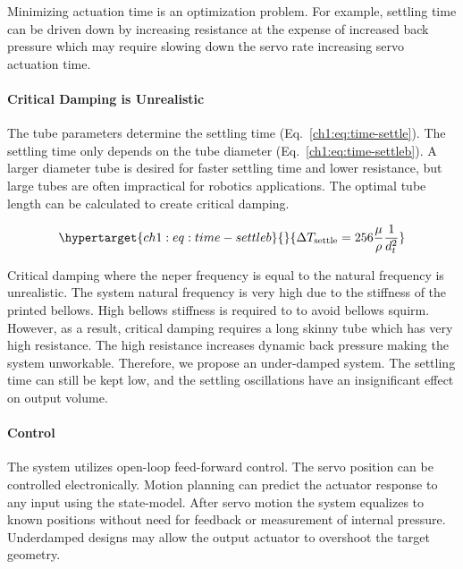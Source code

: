 Minimizing actuation time is an optimization problem. For example,
settling time can be driven down by increasing resistance at the expense
of increased back pressure which may require slowing down the servo rate
increasing servo actuation time.

\hypertarget{ch1:critical-damping-is-unrealistic}{%
\paragraph{Critical Damping is
Unrealistic}\label{ch1:critical-damping-is-unrealistic}}

The tube parameters determine the settling time
(Eq.~\ref{ch1:eq:time-settle}). The settling time only depends on the tube
diameter (Eq.~\ref{ch1:eq:time-settleb}). A larger diameter tube is desired
for faster settling time and lower resistance, but large tubes are often
impractical for robotics applications. The optimal tube length can be
calculated to create critical damping.

\begin{equation}\protect\hypertarget{ch1:eq:time-settleb}{}{ \Delta T_\text{settle} = 256\frac{\mu}{\rho} \frac{1}{d_t^2}   
}\label{ch1:eq:time-settleb}\end{equation}

Critical damping where the neper frequency is equal to the natural
frequency is unrealistic. The system natural frequency is very high due
to the stiffness of the printed bellows. High bellows stiffness is
required to to avoid bellows squirm. However, as a result, critical
damping requires a long skinny tube which has very high resistance. The
high resistance increases dynamic back pressure making the system
unworkable. Therefore, we propose an under-damped system. The settling
time can still be kept low, and the settling oscillations have an
insignificant effect on output volume.

\hypertarget{ch1:control}{%
\paragraph{Control}\label{ch1:control}}

The system utilizes open-loop feed-forward control. The servo position
can be controlled electronically. Motion planning can predict the
actuator response to any input using the state-model. After servo motion
the system equalizes to known positions without need for feedback or
measurement of internal pressure. Underdamped designs may allow the
output actuator to overshoot the target geometry.


